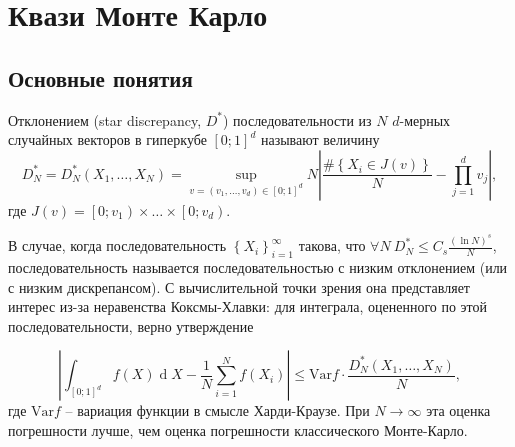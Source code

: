 \documentclass[specialist,
               substylefile = ../spbu.rtx,
               subf,href,colorlinks=true, 12pt]{disser}
\newcommand{\abs}[1]{\left\lvert#1\right\rvert}
\DeclareMathOperator{\dd}{d}
\begin{document}







\chapter{Квази Монте Карло} %
\label{cha:quasi_monte_carlo}

\section{Основные понятия} %
\label{sec:quasi_mc_definition}

Отклонением (star discrepancy, $D^*$) последовательности из $N$ $d$-мерных случайных векторов в гиперкубе $\left[0;1\right]^d$ называют величину
$$D_N^* = D_N^*\left(X_1, \dots, X_N\right) = \sup_{v = (v_1, \dots, v_d) \in \left[0;1\right]^d} N \abs{\frac{\#\left\{ X_i \in J(v) \right\}}{N} - \prod_{j = 1}^d v_j},$$
где $J(v) = \left[0; v_1\right) \times \dots \times \left[0; v_d\right)$.

В случае, когда последовательность $\left\{ X_i\right\}_{i=1}^\infty$ такова, что $\forall N \: D_N^* \leq C_s \frac{(\ln N)^s}{N}$, последовательность называется последовательностью с низким отклонением (или с низким дискрепансом). С вычислительной точки зрения она представляет интерес из-за неравенства Коксмы-Хлавки: для интеграла, оцененного по этой последовательности, верно утверждение

\begin{equation}\label{eq:koksma-hlawka}
\abs{\int_{\left[0;1\right]^d} f(X) \dd X - \frac{1}{N}\sum_{i=1}^N f(X_i)} \leq \mathrm{Var}f\cdot \frac{D_N^*\left(X_1, \dots, X_N\right)}{N},
\end{equation}
где $\mathrm{Var}f$ -- вариация функции в смысле Харди-Краузе. При $N\to\infty$ эта оценка погрешности лучше, чем оценка погрешности классического Монте-Карло.
\end{document}
